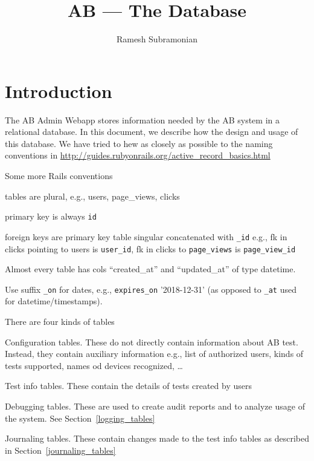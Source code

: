 \documentclass[letterpaper]{article}
\begin{document}
\title{AB --- The Database}
\author{ Ramesh Subramonian }
\maketitle
\thispagestyle{fancy}
\lhead{}
\chead{}
\rhead{}
\cfoot{}
\rfoot{{\small \thepage}}
\section{Introduction}

The AB Admin Webapp stores information needed by the AB system in a relational
database. In this document, we describe how the design and usage of this
database. 
We have tried to hew as closely as possible to the 
naming conventions in
\url{http://guides.rubyonrails.org/active_record_basics.html}

Some more Rails conventions
\bi
\item  tables are plural, e.g., users, page\_views, clicks
\item primary key is always {\tt id}
\item foreign keys are primary key table singular concatenated with \verb+_id+
  e.g., fk in clicks pointing to users is \verb+user_id+, 
  fk in clicks to \verb+page_views+ is \verb+page_view_id+
\item Almost every table has cols ``created\_at'' and
``updated\_at'' of type datetime. 
\item Use suffix \verb+_on+ for dates, e.g., \verb+expires_on+ '2018-12-31'
(as opposed to \verb+_at+ used for datetime/timestamps).
\ei

There are four kinds of tables 
\be
\item Configuration tables. These do not directly contain information about AB test.
Instead, they contain auxiliary information e.g., list of authorized users,
kinds of tests supported, names od devices recognized, \ldots
\item Test info tables. These contain the details of tests created by users
\item Debugging tables. These are used to create audit reports and to
  analyze usage of the system. See Section~\ref{logging_tables}
\item Journaling tables. These contain changes made to the test info tables as
described in Section~\ref{journaling_tables}
\ee
\end{document}
